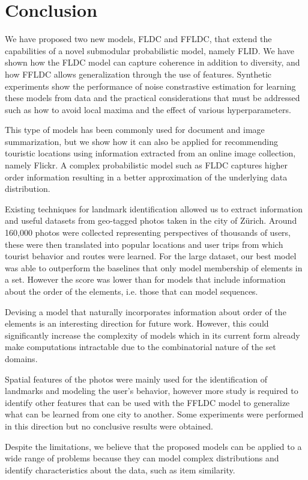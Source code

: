 \chapter{Conclusion}
\label{sec:conclusion}

We have proposed two new models, FLDC and FFLDC, that extend the capabilities of a novel submodular probabilistic model, namely FLID. We have shown how the FLDC model can capture coherence in addition to diversity, and how FFLDC allows generalization through the use of features. Synthetic experiments show the performance of noise constrastive estimation for learning these models from data and the practical considerations that must be addressed such as how to avoid local maxima and the effect of various hyperparameters.

This type of models has been commonly used for document and image summarization, but we show how it can also be applied for recommending touristic locations using information extracted from an online image collection, namely Flickr. A complex probabilistic model such as FLDC captures higher order information resulting in a better approximation of the underlying data distribution.

Existing techniques for landmark identification allowed us to extract information and useful datasets from geo-tagged photos taken in the city of Zürich. Around 160,000 photos were collected representing perspectives of thousands of users, these were then translated into popular locations and user trips from which tourist behavior and routes were learned. For the large dataset, our best model was able to outperform the baselines that only model membership of elements in a set. However the score was lower than for models that include information about the order of the elements, i.e. those that can model sequences.

Devising a model that naturally incorporates information about order of the elements is an interesting direction for future work. However, this could significantly increase the complexity of models which in its current form already make computations intractable due to the combinatorial nature of the set domains.

Spatial features of the photos were mainly used for the identification of landmarks and modeling the user's behavior, however more study is required to identify other features that can be used with the FFLDC model to generalize what can be learned from one city to another. Some experiments were performed in this direction but no conclusive results were obtained.

Despite the limitations, we believe that the proposed models can be applied to a wide range of problems because they can model complex distributions and identify characteristics about the data, such as item similarity.